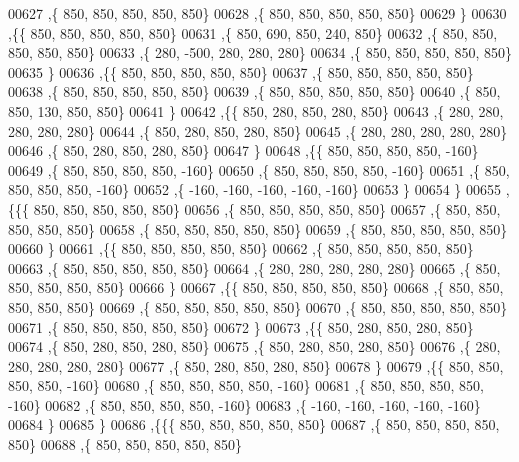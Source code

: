 \begin{DoxyCode}
00627    ,\{   850,   850,   850,   850,   850\}
00628    ,\{   850,   850,   850,   850,   850\}
00629    \}
00630   ,\{\{   850,   850,   850,   850,   850\}
00631    ,\{   850,   690,   850,   240,   850\}
00632    ,\{   850,   850,   850,   850,   850\}
00633    ,\{   280,  -500,   280,   280,   280\}
00634    ,\{   850,   850,   850,   850,   850\}
00635    \}
00636   ,\{\{   850,   850,   850,   850,   850\}
00637    ,\{   850,   850,   850,   850,   850\}
00638    ,\{   850,   850,   850,   850,   850\}
00639    ,\{   850,   850,   850,   850,   850\}
00640    ,\{   850,   850,   130,   850,   850\}
00641    \}
00642   ,\{\{   850,   280,   850,   280,   850\}
00643    ,\{   280,   280,   280,   280,   280\}
00644    ,\{   850,   280,   850,   280,   850\}
00645    ,\{   280,   280,   280,   280,   280\}
00646    ,\{   850,   280,   850,   280,   850\}
00647    \}
00648   ,\{\{   850,   850,   850,   850,  -160\}
00649    ,\{   850,   850,   850,   850,  -160\}
00650    ,\{   850,   850,   850,   850,  -160\}
00651    ,\{   850,   850,   850,   850,  -160\}
00652    ,\{  -160,  -160,  -160,  -160,  -160\}
00653    \}
00654   \}
00655  ,\{\{\{   850,   850,   850,   850,   850\}
00656    ,\{   850,   850,   850,   850,   850\}
00657    ,\{   850,   850,   850,   850,   850\}
00658    ,\{   850,   850,   850,   850,   850\}
00659    ,\{   850,   850,   850,   850,   850\}
00660    \}
00661   ,\{\{   850,   850,   850,   850,   850\}
00662    ,\{   850,   850,   850,   850,   850\}
00663    ,\{   850,   850,   850,   850,   850\}
00664    ,\{   280,   280,   280,   280,   280\}
00665    ,\{   850,   850,   850,   850,   850\}
00666    \}
00667   ,\{\{   850,   850,   850,   850,   850\}
00668    ,\{   850,   850,   850,   850,   850\}
00669    ,\{   850,   850,   850,   850,   850\}
00670    ,\{   850,   850,   850,   850,   850\}
00671    ,\{   850,   850,   850,   850,   850\}
00672    \}
00673   ,\{\{   850,   280,   850,   280,   850\}
00674    ,\{   850,   280,   850,   280,   850\}
00675    ,\{   850,   280,   850,   280,   850\}
00676    ,\{   280,   280,   280,   280,   280\}
00677    ,\{   850,   280,   850,   280,   850\}
00678    \}
00679   ,\{\{   850,   850,   850,   850,  -160\}
00680    ,\{   850,   850,   850,   850,  -160\}
00681    ,\{   850,   850,   850,   850,  -160\}
00682    ,\{   850,   850,   850,   850,  -160\}
00683    ,\{  -160,  -160,  -160,  -160,  -160\}
00684    \}
00685   \}
00686  ,\{\{\{   850,   850,   850,   850,   850\}
00687    ,\{   850,   850,   850,   850,   850\}
00688    ,\{   850,   850,   850,   850,   850\}

\end{DoxyCode}
